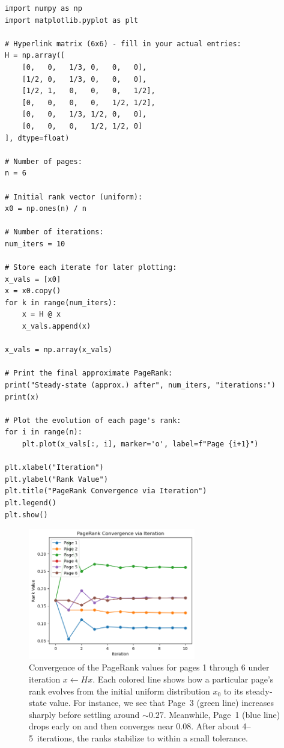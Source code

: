 \documentclass{article}
\begin{document}
\begin{verbatim}
import numpy as np
import matplotlib.pyplot as plt

# Hyperlink matrix (6x6) - fill in your actual entries:
H = np.array([
    [0,   0,   1/3, 0,   0,   0],
    [1/2, 0,   1/3, 0,   0,   0],
    [1/2, 1,   0,   0,   0,   1/2],
    [0,   0,   0,   0,   1/2, 1/2],
    [0,   0,   1/3, 1/2, 0,   0],
    [0,   0,   0,   1/2, 1/2, 0]
], dtype=float)

# Number of pages:
n = 6

# Initial rank vector (uniform):
x0 = np.ones(n) / n

# Number of iterations:
num_iters = 10

# Store each iterate for later plotting:
x_vals = [x0]
x = x0.copy()
for k in range(num_iters):
    x = H @ x
    x_vals.append(x)

x_vals = np.array(x_vals)

# Print the final approximate PageRank:
print("Steady-state (approx.) after", num_iters, "iterations:")
print(x)

# Plot the evolution of each page's rank:
for i in range(n):
    plt.plot(x_vals[:, i], marker='o', label=f"Page {i+1}")

plt.xlabel("Iteration")
plt.ylabel("Rank Value")
plt.title("PageRank Convergence via Iteration")
plt.legend()
plt.show()
\end{verbatim}



\begin{figure}[h]
      \centering
      \includegraphics[width=0.65\textwidth]{img/PageRank Convergence via Iteration.png}
      \caption{%
        Convergence of the PageRank values for pages 1 through 6 under iteration 
        \(x \leftarrow Hx\). Each colored line shows how a particular page's rank 
        evolves from the initial uniform distribution \(x_0\) to its steady‐state 
        value. For instance, we see that Page~3 (green line) increases sharply 
        before settling around \(\sim 0.27\). 
        Meanwhile, Page~1 (blue line) drops early on and then converges near \(0.08\). 
        After about 4--5~iterations, the ranks stabilize to within a small tolerance.
      }
      \label{fig:pagerank-convergence}
\end{figure}
\end{document}
